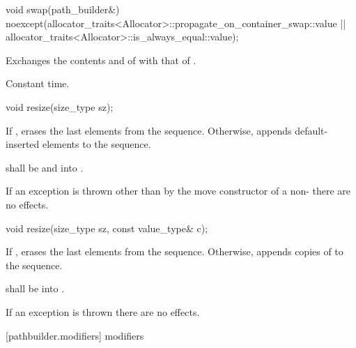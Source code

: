 \begin{itemdecl}
	void swap(path_builder&)
	noexcept(allocator_traits<Allocator>::propagate_on_container_swap::value ||
	allocator_traits<Allocator>::is_always_equal::value);
\end{itemdecl}
\begin{itemdescr}
	\pnum
	\effects
	Exchanges the contents and
	of
	with that of .
	
	\pnum
	\complexity
	Constant time.
\end{itemdescr}

\begin{itemdecl}
	void resize(size_type sz);
\end{itemdecl}
\begin{itemdescr}
	\pnum
	\effects
	If , erases the last  elements
	from the sequence. Otherwise, appends  default-inserted 
	elements to the sequence.
	
	\pnum
	\requires
	 shall be
	 and  into .
	
	\pnum
	\remarks
	If an exception is thrown other than by the move constructor of a 
	non-
	 there are no effects.
\end{itemdescr}

\begin{itemdecl}
	void resize(size_type sz, const value_type& c);
\end{itemdecl}
\begin{itemdescr}
	\pnum
	\effects
	If , erases the last  elements
	from the sequence. Otherwise,
	appends  copies of  to the sequence.
	
	\pnum
	\requires
	 shall be  into .
	
	\pnum
	\remarks
	If an exception is thrown there are no effects.
\end{itemdescr}

 [pathbuilder.modifiers] { modifiers}

